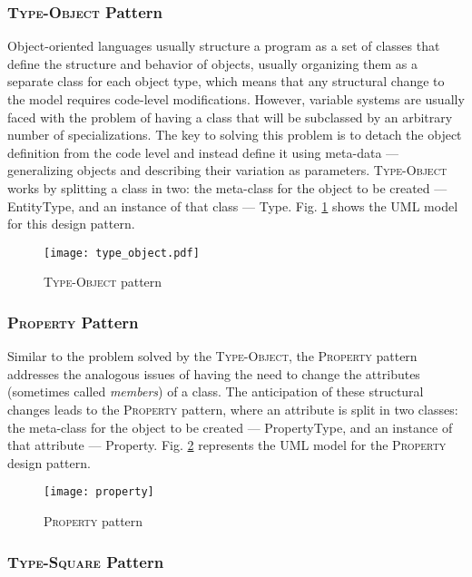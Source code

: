 \subsubsection{\textsc{Type-Object} Pattern}\label{sec:type-entity_pattern}

Object-oriented languages usually structure a program as a set of classes that define the structure and behavior of objects, usually organizing them as a separate class for each object type, which means that any structural change to the model requires code-level modifications. However, variable systems are usually faced with the problem of having a class that will be subclassed by an arbitrary number of specializations. The key to solving this problem is to detach the object definition from the code level and instead define it using meta-data --- generalizing objects and describing their variation as parameters. \textsc{Type-Object} works by splitting a class in two: the meta-class for the object to be created --- EntityType, and an instance of that class --- Type. Fig. \ref{fig:type-object_pattern} shows the UML model for this design pattern.

\begin{figure}[H]
  \centering
  \texttt{[image: type\_object.pdf]}
  \caption{\textsc{Type-Object} pattern}
  \label{fig:type-object_pattern}
\end{figure}

\subsubsection{\textsc{Property} Pattern}\label{sec:property_pattern}

Similar to the problem solved by the \textsc{Type-Object}, the \textsc{Property} pattern addresses the analogous issues of having the need to change the attributes (sometimes called \emph{members}) of a class. The anticipation of these structural changes leads to the \textsc{Property} pattern, where an attribute is split in two classes: the meta-class for the object to be created --- PropertyType, and an instance of that attribute --- Property. Fig. \ref{fig:property_pattern} represents the UML model for the \textsc{Property} design pattern.

\begin{figure}[H]
  \centering
  \texttt{[image: property]}
  \caption{\textsc{Property} pattern}
  \label{fig:property_pattern}
\end{figure}

\subsubsection{\textsc{Type-Square} Pattern}\label{sec:type-square_pattern}

